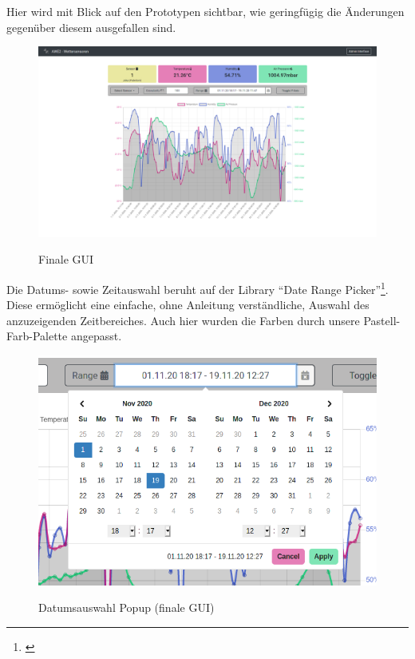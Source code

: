 
\label{gui-fertig}

Hier wird mit Blick auf den Prototypen sichtbar, wie geringfügig die Änderungen gegenüber diesem ausgefallen sind.

\begin{figure}[h!!]
    \centering
    \begin{minipage}[t]{1\textwidth}
        \caption{Finale GUI}
        \includegraphics[width=1\textwidth]{img/gui-fertig.png}\\
        \label{fig:finale-gui}
    \end{minipage}
\end{figure}

\pagebreak

\label{datumsauswahl}

Die Datums- sowie Zeitauswahl beruht auf der Library \enquote{Date Range Picker}\footnote{\cite{daterangepicker.2020}}.
Diese ermöglicht eine einfache, ohne Anleitung verständliche, Auswahl des anzuzeigenden Zeitbereiches.
Auch hier wurden die Farben durch unsere Pastell-Farb-Palette angepasst.

\begin{figure}[h!!]
    \centering
    \begin{minipage}[t]{1\textwidth}
        \caption{Datumsauswahl Popup (finale GUI)}
        \includegraphics[width=1\textwidth]{img/datumsauswahl.png}\\
        \label{fig:datumsauswahl}
    \end{minipage}
\end{figure}

